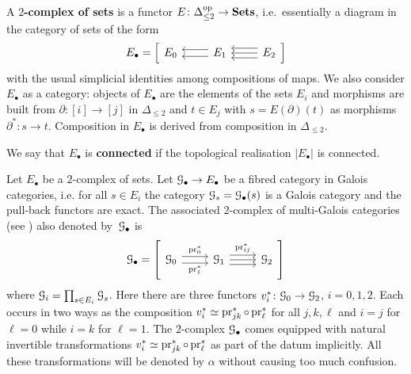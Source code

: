 A \textbf{$2$-complex of sets} is a functor $E \colon \Delta_{\leq 2}^{\rm op}  \to \mathbf{Sets}$, 
i.e.~essentially a diagram in the category of sets of the form
\[
E_\bullet = \Big[\begin{tikzcd}
E_0 & \ar[l,shift right=0.7ex] \ar[l,shift left=0.7ex] E_1 & \ar[l,shift right=1ex] \ar[l,shift left=1ex] \ar[l] E_2  
\end{tikzcd}\Big]
\]
with the usual simplicial identities among compositions of maps. 
We also consider $E_\bullet$ as a category: objects of $E_\bullet$ are the elements of the sets $E_i$ and morphisms are built from $\partial\colon [i] \to [j]$ in $\Delta_{\leq 2}$ and $t \in E_j$ with $s = E(\partial)(t)$ as  morphisms $\partial^\ast\colon s \to t$. Composition in $E_\bullet$ is derived from composition in $\Delta_{\leq 2}$. 

\begin{defi}
    We say that $E_\bullet$ is \textbf{connected} if the topological realisation $|E_\bullet|$ is connected. 
\end{defi}

Let $E_\bullet$ be a $2$-complex of sets. Let ${\mathcal G}_\bullet \to E_\bullet$ be a fibred category in Galois categories, i.e. for all $s \in E_i$ the category ${\mathcal G}_s = {\mathcal G}_\bullet(s)$ is a Galois category and the pull-back functors are exact. The associated $2$-complex of multi-Galois categories (see \cite[V~\S9]{SGA1})
also denoted by~${\mathcal G}_\bullet$ is 
\[
\cG_\bullet = \left[\begin{tikzcd}
\cG_0 \ar[r,shift right=0.7ex,"{\pr_1^\ast}",swap] \ar[r,shift left=0.7ex,"\pr_0^\ast"]  &  \cG_1 \ar[r, shift left=1ex,"{\pr_{ij}^\ast}"] \ar[r,shift right=1ex] \ar[r] & \cG_2 
\end{tikzcd}\right]
\]
where ${\mathcal G}_i = \prod_{s \in E_i} {\mathcal G}_s$. Here there are three functors $v_i^\ast \colon {\mathcal G}_0 \to {\mathcal G}_2$, $i=0,1,2$. Each occurs in two ways as the composition $v_i^\ast \simeq  \operatorname{pr}_{jk}^\ast \circ \operatorname{pr}_\ell^\ast$ for all $j,k,\ell$ and $i = j$ for $\ell = 0$ while $i = k$ for $\ell = 1$. 
The $2$-complex ${\mathcal G}_\bullet$ comes equipped with natural invertible transformations $v_i^\ast \simeq  \operatorname{pr}_{jk}^\ast \circ \operatorname{pr}_\ell^\ast$ as part of the datum implicitly. All these transformations will be denoted by $\alpha$ without causing too much confusion. 

